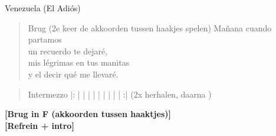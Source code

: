 \begin{song}{Venezuela (El Adiós)}
\begin{verse}{Brug (2e keer de akkoorden tussen haakjes spelen)}
Ma\~{n}ana cuando partamos\\
un recuerdo te dejar\'{e},\hspace{2em}\hspace{5em}\\
mis l\'{e}grimas en tus manitas\\
y el decir qu\'{e} me llevar\'{e}.\\
\end{verse}
\begin{verse}{Intermezzo}
|:  |  \hspace{2em} | \hspace{3.9em} |  \hspace{2em} | \hspace{4em} |  \hspace{2em} |  \hspace{3em} |  \hspace{2em} | \hspace{0.3em} \hspace{2em} |  \hspace{2.55em} :| (2x herhalen, daarna )\\

\end{verse}

\textbf{[Brug in F (akkoorden tussen haaktjes)]}\\
\textbf{[Refrein + intro]}\\
\vspace{10em}
\end{song}
